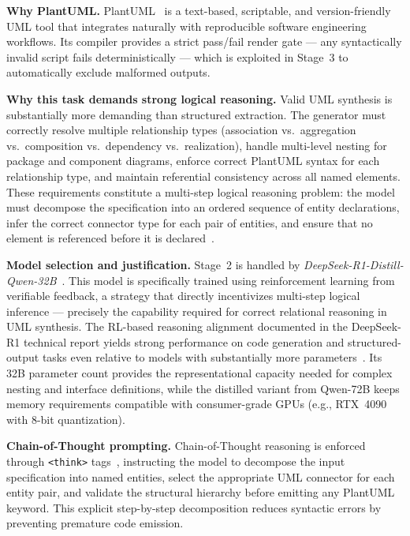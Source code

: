 \documentclass[conference]{IEEEtran}
\begin{document}
\textbf{Why PlantUML.}
PlantUML~\cite{plantuml} is a text-based, scriptable, and
version-friendly UML tool that integrates naturally with reproducible
software engineering workflows. Its compiler provides a strict
pass/fail render gate — any syntactically invalid script fails
deterministically — which is exploited in Stage~3 to automatically
exclude malformed outputs.

\textbf{Why this task demands strong logical reasoning.}
Valid UML synthesis is substantially more demanding than structured
extraction. The generator must correctly resolve multiple relationship
types (association vs.\ aggregation vs.\ composition vs.\
dependency vs.\ realization), handle multi-level nesting for package
and component diagrams, enforce correct PlantUML syntax for each
relationship type, and maintain referential consistency across all
named elements. These requirements constitute a multi-step logical
reasoning problem: the model must decompose the specification into an
ordered sequence of entity declarations, infer the correct connector
type for each pair of entities, and ensure that no element is
referenced before it is declared~\cite{wei2022}.

\textbf{Model selection and justification.}
Stage~2 is handled by \textit{DeepSeek-R1-Distill-Qwen-32B}~\cite{deepseek2025}.
This model is specifically trained using reinforcement learning from
verifiable feedback, a strategy that directly incentivizes multi-step
logical inference — precisely the capability required for correct
relational reasoning in UML synthesis. The RL-based reasoning
alignment documented in the DeepSeek-R1 technical report yields
strong performance on code generation and structured-output tasks
even relative to models with substantially more parameters~\cite{deepseek2025}.
Its 32B parameter count provides the representational capacity needed
for complex nesting and interface definitions, while the distilled
variant from Qwen-72B keeps memory requirements compatible with
consumer-grade GPUs (e.g., RTX~4090 with 8-bit quantization).

\textbf{Chain-of-Thought prompting.}
Chain-of-Thought reasoning is enforced through \texttt{<think>}
tags~\cite{wei2022}, instructing the model to decompose the input
specification into named entities, select the appropriate UML
connector for each entity pair, and validate the structural hierarchy
before emitting any PlantUML keyword. This explicit step-by-step
decomposition reduces syntactic errors by preventing premature code
emission.
\end{document}

